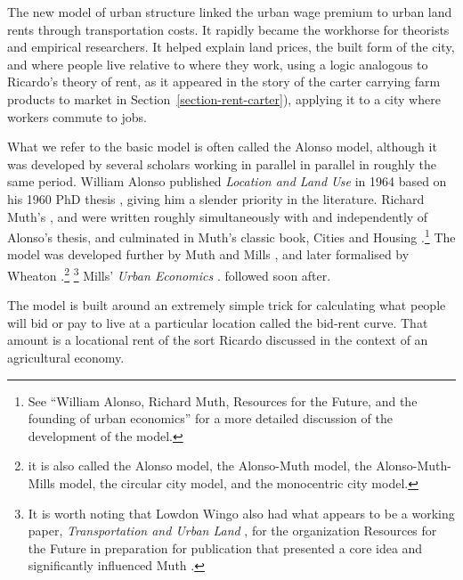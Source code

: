 The new  model of urban structure linked the urban wage premium to urban land rents through transportation costs.  It rapidly became the workhorse for theorists and empirical researchers. It helped explain land prices, the built form of the city, and where people live relative to where they work, using a logic analogous to Ricardo's theory of rent, as it appeared in the story of the carter carrying farm products to market in Section~\ref{section-rent-carter}), applying it to a city where workers commute to jobs. 


What we refer to the basic model is often called the Alonso model, although it  was developed by several scholars working in parallel in parallel in roughly the same period. William Alonso published \textit{Location and Land Use} in 1964  \cite{alonsoLocationLandUse1964} based on his 1960 PhD thesis \cite{alonsoModelUrbanLand1960},  
giving him a slender priority in the literature. 
Richard Muth's \cite{muthSpatialStructureHousing1961}, and \cite{muthRationalExpectationsTheory1961} were written roughly simultaneously with and independently of Alonso's thesis, and culminated in Muth's classic book, Cities and Housing  \cite{muthCitiesHousingSpatial1969}.\footnote{See ``William Alonso, Richard Muth, Resources for  the Future, and the founding of urban economics''\cite{mcdonaldWilliamAlonsoRichard2007} for a more detailed discussion of the development of the model.}  %
 The model was developed further by Muth \cite{muthCitiesHousingSpatial1969} and Mills \cite{millsAggregativeModelResource1967}, and later formalised by Wheaton \cite{wheatonComparativeStaticAnalysis1974}.\footnote{it is also called the Alonso model, the Alonso-Muth model, the Alonso-Muth-Mills model, the circular city model, and the monocentric city model.} %
\footnote{It is worth noting that Lowdon Wingo also had what appears to be a working paper, \textit{Transportation and Urban Land} \cite{wingoTransportationUrbanLand1961}, for the organization Resources for the Future  in preparation for publication that presented a core idea and  significantly influenced Muth \cite{mcdonaldWilliamAlonsoRichard2007}.} Mills' \textit{Urban Economics} \cite{millsUrbanEconomics1972}. followed soon after. 

The model is built around an extremely simple trick for calculating what people will bid or pay to live at a particular location  called the \gls{bid-rent curve}. That amount is a locational rent of the sort Ricardo discussed in the context of an agricultural economy.  

